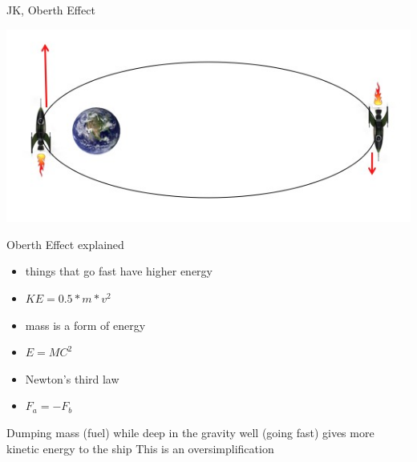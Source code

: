 \begin{frame}[t]{JK, Oberth Effect}
    \begin{block}{}
        \includegraphics[width=\textwidth]{images/obert_effect}
    \end{block}
\end{frame}
\begin{frame}[t]{Oberth Effect explained}
    \begin{block}{}
        \begin{itemize}
            \item things that go fast have higher energy
            \item $KE = 0.5 * m * v^2$
        \end{itemize}
    \end{block}
    \begin{block}{}
        \begin{itemize}
            \item mass is a form of energy
            \item $E = MC^2$
        \end{itemize}
    \end{block}
    \begin{block}{}
        \begin{itemize}
            \item Newton's third law
            \item $F_a = -F_b$
        \end{itemize}
    \end{block}
    \begin{block}{}
        Dumping mass (fuel) while deep in the gravity well (going fast) gives more kinetic energy to the ship {\tiny
        This is an oversimplification}
    \end{block}
\end{frame}
